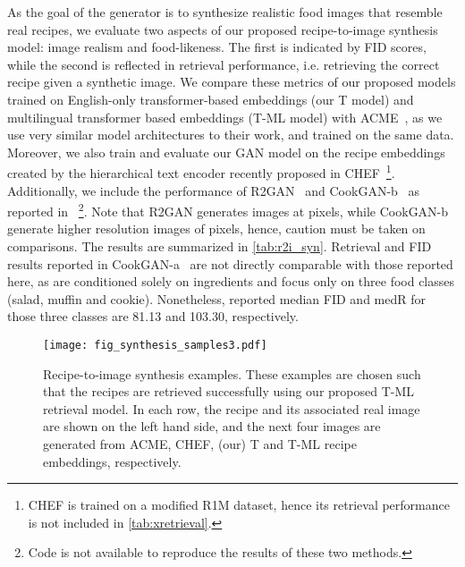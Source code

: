 \documentclass[sigconf,nonacm]{acmart}
\begin{document}
As the goal of the generator  is to synthesize realistic food images that resemble real recipes, we evaluate two aspects of our proposed recipe-to-image synthesis model: image realism and food-likeness. The first is indicated by FID scores, while the second is reflected in retrieval performance, i.e. retrieving the correct recipe given a synthetic image. We compare these metrics of our proposed models trained on English-only transformer-based embeddings (our T model) and multilingual transformer based embeddings (T-ML model) with ACME~\cite{wang2019}, as we use very similar model architectures to their work, and trained on the same data. Moreover, we also train and evaluate our GAN model on the recipe embeddings created by the hierarchical text encoder recently proposed in CHEF~\cite{chef2021}\footnote{CHEF is trained on a modified R1M dataset, hence its retrieval performance is not included in \autoref{tab:xretrieval}.}. Additionally, we include the performance of R2GAN~\cite{Zhu2019} and CookGAN-b~\cite{zhu2020} as reported in ~\cite{zhu2020}\footnote{Code is not available to reproduce the results of these two methods.}. Note that R2GAN generates images at  pixels, while CookGAN-b generate higher resolution images of  pixels, hence, caution must be taken on comparisons. The results are summarized in \autoref{tab:r2i_syn}. Retrieval and FID results reported in CookGAN-a~\cite{Han2020} are not directly comparable with those reported here, as are conditioned solely on ingredients and focus only on three food classes (salad, muffin and cookie). Nonetheless, reported median FID and medR for those three classes are 81.13 and 103.30, respectively.

\begin{figure*}[!ht]
    \centering
    \texttt{[image: fig\_synthesis\_samples3.pdf]}
    \caption{Recipe-to-image synthesis examples. These examples 
    are chosen such that the recipes are 
retrieved successfully using our proposed T-ML 
    retrieval 
    model. In each row, the recipe and its associated real image are shown on the left hand side, and the next four images are generated from ACME, CHEF, (our) T and T-ML recipe embeddings, respectively. 
    }
    \label{fig:synthesis}
\end{figure*}
\end{document}
